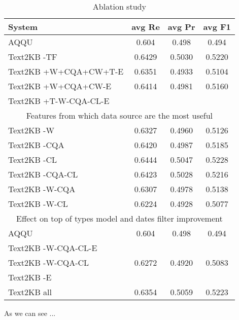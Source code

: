 \begin{table}
\caption{Ablation study}
\label{table:webquestions_ablation}
\begin{tabular}{| p{4cm} | c | c | c | }
\hline
System & avg Re & avg Pr &  avg F1 \\
\hline
AQQU & 0.604 & 0.498 & 0.494\\
Text2KB -TF & 0.6429 & 0.5030 & 0.5220 \\
\hline
Text2KB +W+CQA+CW+T-E & 0.6351 & 0.4933 & 0.5104 \\
Text2KB +W+CQA+CW-E & 0.6414 & 0.4981 & 0.5160 \\
Text2KB +T-W-CQA-CL-E &  &  & \\
\hline
\multicolumn{4}{|c|}{Features from which data source are the most useful} \\
\hline
Text2KB -W & 0.6327 & 0.4960 & 0.5126 \\
Text2KB -CQA & 0.6420 & 0.4987 & 0.5185 \\
Text2KB -CL & 0.6444 & 0.5047 & 0.5228 \\
\hline
Text2KB -CQA-CL & 0.6423 & 0.5028 & 0.5216 \\
Text2KB -W-CQA & 0.6307 & 0.4978 & 0.5138 \\
Text2KB -W-CL & 0.6224 & 0.4928 & 0.5077 \\
\hline
\multicolumn{4}{|c|}{Effect on top of types model and dates filter improvement} \\
\hline
AQQU & 0.604 & 0.498 & 0.494\\
Text2KB -W-CQA-CL-E &  &  & \\
Text2KB -W-CQA-CL & 0.6272 & 0.4920 & 0.5083 \\  %
Text2KB -E &  &  &  \\  %

\hline
Text2KB all & 0.6354 & 0.5059 & 0.5223 \\
\hline
\end{tabular}
\end{table}

As we can see ...